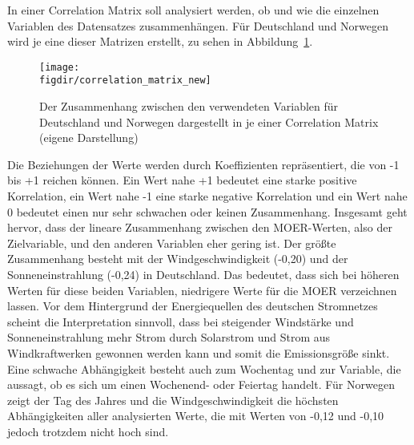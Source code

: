 In einer Correlation Matrix soll analysiert werden, ob und wie die einzelnen Variablen des Datensatzes zusammenhängen.
Für Deutschland und Norwegen wird je eine dieser Matrizen erstellt, zu sehen in Abbildung~\ref{FIG:correlation_matrix}.
\begin{figure}
 \caption[Correlation Matrix der Eingabevariablen für die Prognose]{Der Zusammenhang zwischen den verwendeten Variablen für Deutschland und Norwegen dargestellt in je einer Correlation Matrix (eigene Darstellung)}
 {\texttt{[image: \\figdir/correlation\_matrix\_new]}}
 \label{FIG:correlation_matrix}
\end{figure}
Die Beziehungen der Werte werden durch Koeffizienten repräsentiert, die von -1 bis +1 reichen können.
Ein Wert nahe +1 bedeutet eine starke positive Korrelation, ein Wert nahe -1 eine starke negative Korrelation und ein Wert nahe 0 bedeutet einen nur sehr schwachen oder keinen Zusammenhang.
Insgesamt geht hervor, dass der lineare Zusammenhang zwischen den \ac{MOER}-Werten, also der Zielvariable, und den anderen Variablen eher gering ist.
Der größte Zusammenhang besteht mit der Windgeschwindigkeit (-0,20) und der Sonneneinstrahlung (-0,24) in Deutschland.
Das bedeutet, dass sich bei höheren Werten für diese beiden Variablen, niedrigere Werte für die \ac{MOER} verzeichnen lassen.
Vor dem Hintergrund der Energiequellen des deutschen Stromnetzes scheint die Interpretation sinnvoll, dass bei steigender Windstärke und Sonneneinstrahlung mehr Strom durch Solarstrom und Strom aus Windkraftwerken gewonnen werden kann und somit die Emissionsgröße sinkt.
Eine schwache Abhängigkeit besteht auch zum Wochentag und zur Variable, die aussagt, ob es sich um einen Wochenend- oder Feiertag handelt.
Für Norwegen zeigt der Tag des Jahres und die Windgeschwindigkeit die höchsten Abhängigkeiten aller analysierten Werte, die mit Werten von -0,12 und -0,10 jedoch trotzdem nicht hoch sind.

